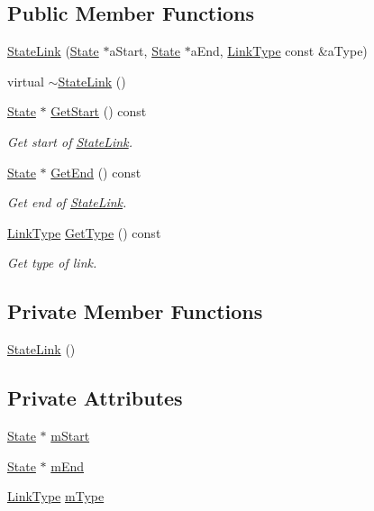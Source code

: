 \subsection*{Public Member Functions}
\begin{DoxyCompactItemize}
\item 
\hyperlink{classStateLink_ae577d392708a38fb3aaae3661310bf41}{State\+Link} (\hyperlink{classState}{State} $\ast$a\+Start, \hyperlink{classState}{State} $\ast$a\+End, \hyperlink{classStateLink_a6392f74d9c3ccb368b0e7e57fec62272}{Link\+Type} const \&a\+Type)
\item 
virtual \hyperlink{classStateLink_a3caa89215894e61eb67405ed55431a36}{$\sim$\+State\+Link} ()
\item 
\hyperlink{classState}{State} $\ast$ \hyperlink{classStateLink_abbfc2a6745a4f28d8c18a4537526c8b9}{Get\+Start} () const 
\begin{DoxyCompactList}\small\item\em Get start of \hyperlink{classStateLink}{State\+Link}. \end{DoxyCompactList}\item 
\hyperlink{classState}{State} $\ast$ \hyperlink{classStateLink_a8d2e3bb1030bfd941b6caf0ed0af50e2}{Get\+End} () const 
\begin{DoxyCompactList}\small\item\em Get end of \hyperlink{classStateLink}{State\+Link}. \end{DoxyCompactList}\item 
\hyperlink{classStateLink_a6392f74d9c3ccb368b0e7e57fec62272}{Link\+Type} \hyperlink{classStateLink_a6bd7382df26a669f1272dc9c7cda4a12}{Get\+Type} () const 
\begin{DoxyCompactList}\small\item\em Get type of link. \end{DoxyCompactList}\end{DoxyCompactItemize}
\subsection*{Private Member Functions}
\begin{DoxyCompactItemize}
\item 
\hyperlink{classStateLink_a39f34e7a8ddcef0d7b19edca4c67f4b2}{State\+Link} ()
\end{DoxyCompactItemize}
\subsection*{Private Attributes}
\begin{DoxyCompactItemize}
\item 
\hyperlink{classState}{State} $\ast$ \hyperlink{classStateLink_a47f68e6eb5aebdea10a4604f05c131c9}{m\+Start}
\item 
\hyperlink{classState}{State} $\ast$ \hyperlink{classStateLink_a29e42554da8f4386c681c420ab8a33a0}{m\+End}
\item 
\hyperlink{classStateLink_a6392f74d9c3ccb368b0e7e57fec62272}{Link\+Type} \hyperlink{classStateLink_aa7c875d1609337ea950c8d09e9a9d9df}{m\+Type}
\end{DoxyCompactItemize}


